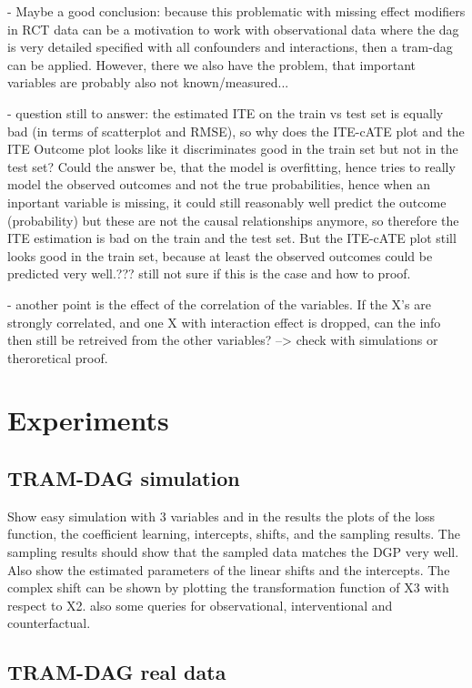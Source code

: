 - Maybe a good conclusion: because this problematic with missing effect modifiers in RCT data can be a motivation to work with observational data where the dag is very detailed specified with all confounders and interactions, then a tram-dag can be applied. However, there we also have the problem, that important variables are probably also not known/measured...

- question still to answer: the estimated ITE on the train vs test set is equally bad (in terms of scatterplot and RMSE), so why does the ITE-cATE plot and the ITE Outcome plot looks like it discriminates good in the train set but not in the test set? Could the answer be, that the model is overfitting, hence tries to really model the observed outcomes and not the true probabilities, hence when an inportant variable is missing, it could still reasonably well predict the outcome (probability) but these are not the causal relationships anymore, so therefore the ITE estimation is bad on the train and the test set. But the ITE-cATE plot still looks good in the train set, because at least the observed outcomes could be predicted very well.??? still not sure if this is the case and how to proof.

- another point is the effect of the correlation of the variables. If the X's are strongly correlated, and one X with interaction effect is dropped, can the info then still be retreived from the other variables? --> check with simulations or theroretical proof.



\section{Experiments}

\subsection{TRAM-DAG simulation}

Show easy simulation with 3 variables and in the results the plots of the loss function, the coefficient learning, intercepts, shifts, and the sampling results. The sampling results should show that the sampled data matches the DGP very well. Also show the estimated parameters of the linear shifts and the intercepts. The complex shift can be shown by plotting the transformation function of X3 with respect to X2. also some queries for observational, interventional and counterfactual.

\subsection{TRAM-DAG real data}

